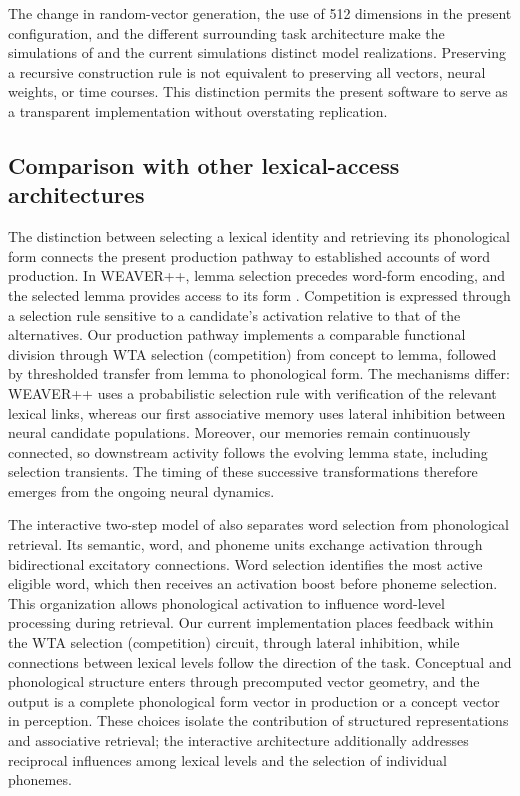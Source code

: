 The change in random-vector generation, the use of 512 dimensions in the present configuration, and the different surrounding task architecture make the simulations of \citet{stille2020} and the current simulations distinct model realizations. Preserving a recursive construction rule is not equivalent to preserving all vectors, neural weights, or time courses. This distinction permits the present software to serve as a transparent implementation without overstating replication.

\subsection{Comparison with other lexical-access architectures}
\label{sec:lexical-architectures}
The distinction between selecting a lexical identity and retrieving its phonological form connects the present production pathway to established accounts of word production. In WEAVER++, lemma selection precedes word-form encoding, and the selected lemma provides access to its form \citep{levelt1999}. Competition is expressed through a selection rule sensitive to a candidate's activation relative to that of the alternatives. Our production pathway implements a comparable functional division through WTA selection (competition) from concept to lemma, followed by thresholded transfer from lemma to phonological form. The mechanisms differ: WEAVER++ uses a probabilistic selection rule with verification of the relevant lexical links, whereas our first associative memory uses lateral inhibition between neural candidate populations. Moreover, our memories remain continuously connected, so downstream activity follows the evolving lemma state, including selection transients. The timing of these successive transformations therefore emerges from the ongoing neural dynamics.

The interactive two-step model of \citet{dell1997} also separates word selection from phonological retrieval. Its semantic, word, and phoneme units exchange activation through bidirectional excitatory connections. Word selection identifies the most active eligible word, which then receives an activation boost before phoneme selection. This organization allows phonological activation to influence word-level processing during retrieval. Our current implementation places feedback within the WTA selection (competition) circuit, through lateral inhibition, while connections between lexical levels follow the direction of the task. Conceptual and phonological structure enters through precomputed vector geometry, and the output is a complete phonological form vector in production or a concept vector in perception. These choices isolate the contribution of structured representations and associative retrieval; the interactive architecture additionally addresses reciprocal influences among lexical levels and the selection of individual phonemes.

